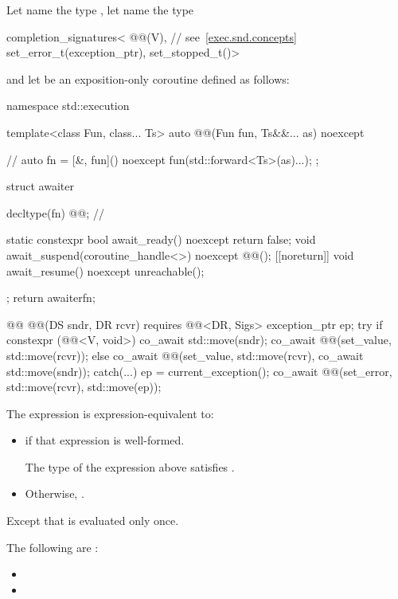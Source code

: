 \pnum
Let  name the type
,
let  name the type
\begin{codeblock}
completion_signatures<
  @@(V),         // see~\ref{exec.snd.concepts}
  set_error_t(exception_ptr),
  set_stopped_t()>
\end{codeblock}
and let  be an exposition-only coroutine
defined as follows:
\begin{codeblock}
namespace std::execution {
  template<class Fun, class... Ts>
  auto @@(Fun fun, Ts&&... as) noexcept {    // \expos
    auto fn = [&, fun]() noexcept { fun(std::forward<Ts>(as)...); };

    struct awaiter {
      decltype(fn) @@;                                     // \expos

      static constexpr bool await_ready() noexcept { return false; }
      void await_suspend(coroutine_handle<>) noexcept { @@(); }
      [[noreturn]] void await_resume() noexcept { unreachable(); }
    };
    return awaiter{fn};
  }

  @@ @@(DS sndr, DR rcvr) requires @@<DR, Sigs> {
    exception_ptr ep;
    try {
      if constexpr (@@<V, void>) {
        co_await std::move(sndr);
        co_await @@(set_value, std::move(rcvr));
      } else {
        co_await @@(set_value, std::move(rcvr), co_await std::move(sndr));
      }
    } catch(...) {
      ep = current_exception();
    }
    co_await @@(set_error, std::move(rcvr), std::move(ep));
  }
}
\end{codeblock}

\pnum
The expression  is expression-equivalent to:
\begin{itemize}
\item
{} if that expression is well-formed.

\mandates
The type of the expression above satisfies .

\item
Otherwise, .
\end{itemize}
Except that  is evaluated only once.

\mandates
The following are :
\begin{itemize}
\item
{}
\item
{}
\end{itemize}

